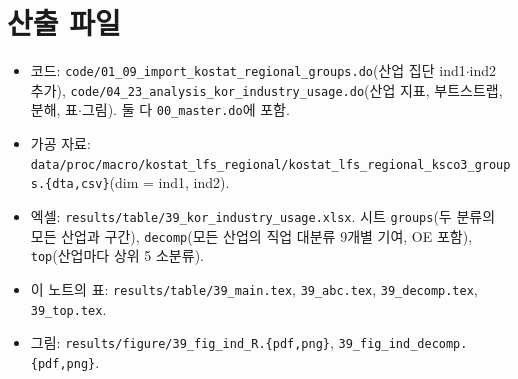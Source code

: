 \documentclass[11pt]{article}
\begin{document}
\section{산출 파일}

\begin{itemize}[leftmargin=*]
  \item 코드: \texttt{code/01\_09\_import\_kostat\_regional\_groups.do}(산업 집단 ind1$\cdot$ind2 추가), \texttt{code/04\_23\_analysis\_kor\_industry\_usage.do}(산업 지표, 부트스트랩, 분해, 표$\cdot$그림). 둘 다 \texttt{00\_master.do}에 포함.
  \item 가공 자료: \texttt{data/proc/macro/kostat\_lfs\_regional/kostat\_lfs\_regional\_ksco3\_groups.\{dta,csv\}}(dim = ind1, ind2).
  \item 엑셀: \texttt{results/table/39\_kor\_industry\_usage.xlsx}. 시트 \texttt{groups}(두 분류의 모든 산업과 구간), \texttt{decomp}(모든 산업의 직업 대분류 9개별 기여, OE 포함), \texttt{top}(산업마다 상위 5 소분류).
  \item 이 노트의 표: \texttt{results/table/39\_main.tex}, \texttt{39\_abc.tex}, \texttt{39\_decomp.tex}, \texttt{39\_top.tex}.
  \item 그림: \texttt{results/figure/39\_fig\_ind\_R.\{pdf,png\}}, \texttt{39\_fig\_ind\_decomp.\{pdf,png\}}.
\end{itemize}

\printbibliography[title={참고문헌}]
\end{document}
